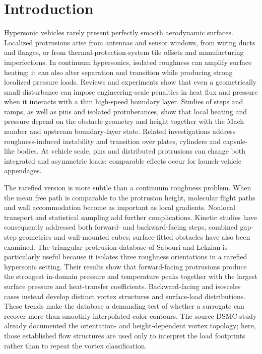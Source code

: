\documentclass[aip,pof,preprint,notitlepage,floatfix,amsmath,amssymb]{revtex4-2}
\begin{document}
\section{Introduction}
Hypersonic vehicles rarely present perfectly smooth aerodynamic surfaces. Localized protrusions arise from antennas and sensor windows, from wiring ducts and flanges, or from thermal-protection-system tile offsets and manufacturing imperfections. In continuum hypersonics, isolated roughness can amplify surface heating; it can also alter separation and transition while producing strong localized pressure loads. Reviews and experiments show that even a geometrically small disturbance can impose engineering-scale penalties in heat flux and pressure when it interacts with a thin high-speed boundary layer.\cite{Schneider2008,BerryHorvath2008} Studies of steps and ramps, as well as pins and isolated protuberances, show that local heating and pressure depend on the obstacle geometry and height together with the Mach number and upstream boundary-layer state.\cite{Grotowsky2000,Estruch2010,Chang2010,Qamar2012,Hahn2013,KumarReddy2013,KumarReddy2014} Related investigations address roughness-induced instability and transition over plates, cylinders and capsule-like bodies.\cite{DeTullio2013,Avallone2016,DuanXiao2017,DiGiovanni2018,BlancoCasares2022,Haley2023} At vehicle scale, pins and distributed protrusions can change both integrated and asymmetric loads; comparable effects occur for launch-vehicle appendages.\cite{Akshay2021,Tsutsui2022,Chandrakumar2023,Leopardi2024}

The rarefied version is more subtle than a continuum roughness problem. When the mean free path is comparable to the protrusion height, molecular flight paths and wall accommodation become as important as local gradients. Nonlocal transport and statistical sampling add further complications. Kinetic studies have consequently addressed both forward- and backward-facing steps, combined gap-step geometries and wall-mounted cubes; surface-fitted obstacles have also been examined.\cite{PullinHarvey1977,LeiteSantos2015,NabapureMurthy2019,WangFang2020,NabapureMurthy2021,ManelaGibelli2020,Gavasane2018,MahdaviRoohi2022,SabouriLekzian2025} The triangular protrusion database of Sabouri and Lekzian is particularly useful because it isolates three roughness orientations in a rarefied hypersonic setting.\cite{SabouriLekzian2026} Their results show that forward-facing protrusions produce the strongest in-domain pressure and temperature peaks together with the largest surface pressure and heat-transfer coefficients. Backward-facing and isosceles cases instead develop distinct vortex structures and surface-load distributions. These trends make the database a demanding test of whether a surrogate can recover more than smoothly interpolated color contours. The source DSMC study already documented the orientation- and height-dependent vortex topology; here, those established flow structures are used only to interpret the load footprints rather than to repeat the vortex classification.
\end{document}
